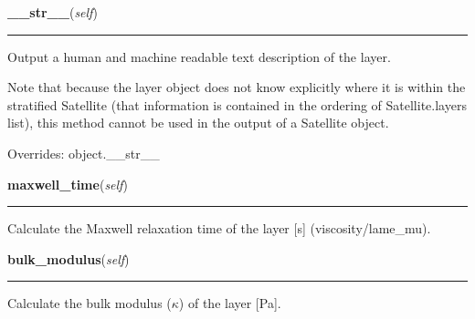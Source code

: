 \hspace{.8\funcindent}\begin{boxedminipage}{\funcwidth}

    \raggedright \textbf{\_\_str\_\_}(\textit{self})

    \vspace{-1.5ex}

    \rule{\textwidth}{0.5\fboxrule}
\setlength{\parskip}{2ex}
    Output a human and machine readable text description of the layer.

    Note that because the layer object does not know explicitly where it is
    within the stratified Satellite (that information is contained in the 
    ordering of Satellite.layers list), this method cannot be used in the 
    output of a Satellite object.

\setlength{\parskip}{1ex}
      Overrides: object.\_\_str\_\_

    \end{boxedminipage}

    \label{SatStress:SatStress:SatLayer:maxwell_time}

    \vspace{0.5ex}

\hspace{.8\funcindent}\begin{boxedminipage}{\funcwidth}

    \raggedright \textbf{maxwell\_time}(\textit{self})

    \vspace{-1.5ex}

    \rule{\textwidth}{0.5\fboxrule}
\setlength{\parskip}{2ex}
    Calculate the Maxwell relaxation time of the layer [s] 
    (viscosity/lame\_mu).

\setlength{\parskip}{1ex}
    \end{boxedminipage}

    \label{SatStress:SatStress:SatLayer:bulk_modulus}

    \vspace{0.5ex}

\hspace{.8\funcindent}\begin{boxedminipage}{\funcwidth}

    \raggedright \textbf{bulk\_modulus}(\textit{self})

    \vspace{-1.5ex}

    \rule{\textwidth}{0.5\fboxrule}
\setlength{\parskip}{2ex}
    Calculate the bulk modulus (\(\kappa\)) of the layer [Pa].

\setlength{\parskip}{1ex}
    \end{boxedminipage}

